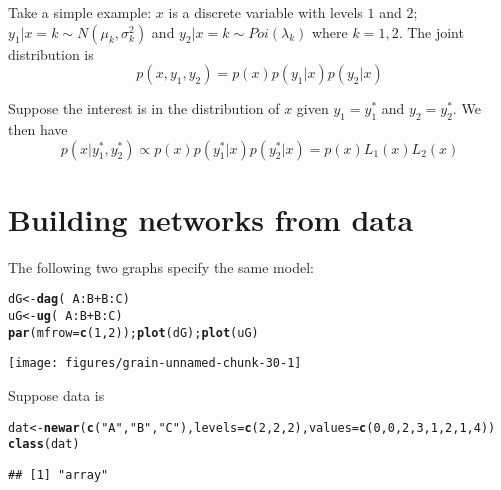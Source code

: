 \documentclass[10pt]{article}\usepackage[]{graphicx}\usepackage[]{color}
\makeatletter
\def\maxwidth{ %
  \ifdim\Gin@nat@width>\linewidth
    \linewidth
  \else
    \Gin@nat@width
  \fi
}
\newcommand{\hlnum}[1]{\textcolor[rgb]{0.686,0.059,0.569}{#1}}%
\newcommand{\hlstr}[1]{\textcolor[rgb]{0.192,0.494,0.8}{#1}}%
\newcommand{\hlopt}[1]{\textcolor[rgb]{0,0,0}{#1}}%
\newcommand{\hlstd}[1]{\textcolor[rgb]{0.345,0.345,0.345}{#1}}%
\newcommand{\hlkwb}[1]{\textcolor[rgb]{0.69,0.353,0.396}{#1}}%
\newcommand{\hlkwc}[1]{\textcolor[rgb]{0.333,0.667,0.333}{#1}}%
\newcommand{\hlkwd}[1]{\textcolor[rgb]{0.737,0.353,0.396}{\textbf{#1}}}%
\newenvironment{kframe}{%
 \def\at@end@of@kframe{}%
 \ifinner\ifhmode%
  \def\at@end@of@kframe{\end{minipage}}%
  \begin{minipage}{\columnwidth}%
 \fi\fi%
 \def\FrameCommand##1{\hskip\@totalleftmargin \hskip-\fboxsep
 \colorbox{shadecolor}{##1}\hskip-\fboxsep
     \hskip-\linewidth \hskip-\@totalleftmargin \hskip\columnwidth}%
 \MakeFramed {\advance\hsize-\width
   \@totalleftmargin\z@ \linewidth\hsize
   \@setminipage}}%
 {\par\unskip\endMakeFramed%
 \at@end@of@kframe}
\newenvironment{knitrout}{}{} %
\makeatother
\begin{document}
Take a simple example: $x$ is a discrete variable with levels $1$ and
$2$; $y_1|x=k \sim N(\mu_k, \sigma^2_k)$ and $y_2|x=k \sim
Poi(\lambda_k)$ where $k=1,2$. The joint distribution is
\begin{displaymath}
  p(x,y_1, y_2) = p(x)p(y_1|x)p(y_2|x)
\end{displaymath}

Suppose the interest is in the distribution of $x$ given
$y_1=y_1^*$ and $y_2=y_2^*$. We then have
\begin{displaymath}
  p(x|y_1^*, y_2^*) \propto p(x) p(y_1^*|x)p(y_2^*|x) =
  p(x) L_1(x) L_2(x)
\end{displaymath}







\section{Building networks from data}
\label{sec:using-textttsm-argum}

The following two graphs specify the same model:
\begin{knitrout}
\color{fgcolor}\begin{kframe}
\begin{alltt}
\hlstd{dG}  \hlkwb{<-} \hlkwd{dag}\hlstd{(}\hlopt{~}\hlstd{A}\hlopt{:}\hlstd{B} \hlopt{+} \hlstd{B}\hlopt{:}\hlstd{C)}
\hlstd{uG}  \hlkwb{<-} \hlkwd{ug}\hlstd{(}\hlopt{~}\hlstd{A}\hlopt{:}\hlstd{B} \hlopt{+} \hlstd{B}\hlopt{:}\hlstd{C)}
\hlkwd{par}\hlstd{(}\hlkwc{mfrow}\hlstd{=}\hlkwd{c}\hlstd{(}\hlnum{1}\hlstd{,}\hlnum{2}\hlstd{));} \hlkwd{plot}\hlstd{( dG );} \hlkwd{plot}\hlstd{( uG )}
\end{alltt}
\end{kframe}
\texttt{[image: figures/grain-unnamed-chunk-30-1]} 

\end{knitrout}

Suppose data is
\begin{knitrout}
\color{fgcolor}\begin{kframe}
\begin{alltt}
\hlstd{dat} \hlkwb{<-} \hlkwd{newar}\hlstd{(}\hlkwd{c}\hlstd{(}\hlstr{"A"}\hlstd{,}\hlstr{"B"}\hlstd{,}\hlstr{"C"}\hlstd{),} \hlkwc{levels}\hlstd{=}\hlkwd{c}\hlstd{(}\hlnum{2}\hlstd{,}\hlnum{2}\hlstd{,}\hlnum{2}\hlstd{),} \hlkwc{values}\hlstd{=}\hlkwd{c}\hlstd{(}\hlnum{0}\hlstd{,}\hlnum{0}\hlstd{,}\hlnum{2}\hlstd{,}\hlnum{3}\hlstd{,}\hlnum{1}\hlstd{,}\hlnum{2}\hlstd{,}\hlnum{1}\hlstd{,}\hlnum{4}\hlstd{))}
\hlkwd{class}\hlstd{(dat)}
\end{alltt}
\begin{verbatim}
## [1] "array"
\end{verbatim}
\end{kframe}
\end{knitrout}
\end{document}
